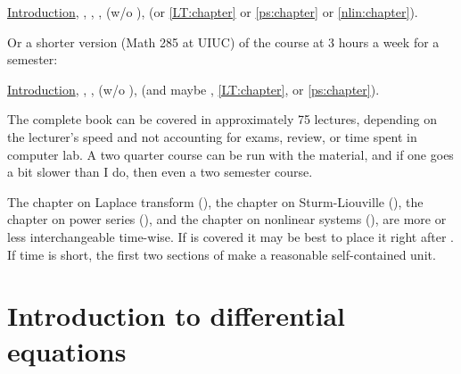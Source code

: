 \documentclass[12pt]{book}
\begin{document}
\medskip

\noindent
\hyperref[intro:chapter]{Introduction},
,
,
,
 (w/o ),
 (or
\ref{LT:chapter} or \ref{ps:chapter} or \ref{nlin:chapter}).

\medskip

Or a shorter version (Math 285 at UIUC) of the course at 3 hours a week for
a semester:

\medskip

\noindent
\hyperref[intro:chapter]{Introduction},
,
,
 (w/o ),
(and maybe ,
\ref{LT:chapter}, or \ref{ps:chapter}).

\medskip

The complete book can be covered in approximately 75 lectures, depending
on the lecturer's speed and not accounting for exams, review,
or time spent in computer lab. %
A two quarter course can be run with the material, and if one goes
a bit slower than I do, then even a two semester course.

%

The chapter on
Laplace transform (),
the chapter on Sturm-Liouville (),
the chapter on power series (),
and the chapter on nonlinear systems (),
are more or less interchangeable time-wise.
If  is covered it may be best to place it right 
after .
If time is short, the first two sections of
 make a reasonable self-contained unit.


\sectionnewpage
\section{Introduction to differential equations}
\label{introde:section}
\end{document}
